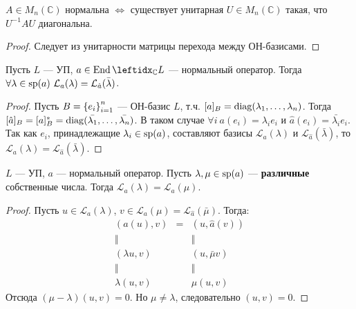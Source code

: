 \begin{cor}
    $A \in M_n(\mathbb{C})$ нормальна $\Leftrightarrow$ существует унитарная $U \in M_n(\mathbb{C})$ такая, что $U^{-1} AU$ диагональна.
\end{cor}

\begin{proof}
    Следует из унитарности матрицы перехода между ОН-базисами.
\end{proof}

\begin{cor}
    Пусть $L$ --- УП, $a \in \End \lsub{\mathbb{C}}{L}$ --- нормальный оператор. Тогда $\forall \lambda \in \operatorname{sp}(a)\ \mathcal{L}_a(\lambda) = \mathcal{L}_{\hat{a}}(\bar{\lambda})$.
\end{cor}

\begin{proof}
    Пусть $B = \left\{e_i\right\}_{i=1}^{n}$ --- ОН-базис $L$, т.ч. $[a]_B = \operatorname{diag}(\lambda_1, \dots, \lambda_n)$. Тогда $[\hat{a}]_B = [a]_B^* = \operatorname{diag}(\bar{\lambda_1}, \dots, \bar{\lambda_n})$. В таком случае $\forall i\ a(e_i) = \lambda_i e_i$ и $\hat{a}(e_i) = \bar{\lambda_i} e_i$. Так как $e_i$, принадлежащие $\lambda_i \in \operatorname{sp}(a)$, составляют базисы $\mathcal{L}_a(\lambda)$ и $\mathcal{L}_{\hat{a}}(\bar{\lambda})$, то $\mathcal{L}_a(\lambda) = \mathcal{L}_{\hat{a}}(\bar{\lambda})$.
\end{proof}

\begin{cor}
    $L$ --- УП, $a$ --- нормальный оператор. Пусть $\lambda, \mu \in \operatorname{sp}(a)$ --- \textbf{различные} собственные числа. Тогда $\mathcal{L}_a(\lambda) = \mathcal{L}_a(\mu)$.
\end{cor}

\begin{proof}
    Пусть $u \in \mathcal{L}_a(\lambda)$, $v \in \mathcal{L}_a(\mu) = \mathcal{L}_{\hat{a}}(\bar{\mu})$. Тогда:
    $$\begin{array}{ccc}
        (a(u), v)      & = & (u, \hat{a}(v)) \\
        \Vert          &   & \Vert           \\
        (\lambda u, v) &   & (u, \bar{\mu}v) \\
        \Vert          &   & \Vert           \\
        \lambda(u, v)  &   & \mu(u, v)
    \end{array}$$
    Отсюда $(\mu - \lambda)(u, v) = 0$. Но $\mu \neq \lambda$, следовательно $(u, v) = 0$.
\end{proof}